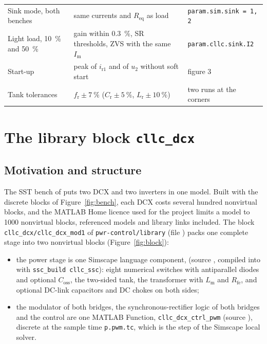 \documentclass[12pt,a4paper]{scrartcl}
\newcommand{\ped}[1]{_{\mathrm{#1}}}
\newcommand{\code}[1]{\texttt{#1}}
\begin{document}
\begin{onehalfspace}
\begin{table}[H]
\begin{tabularx}{0.97\textwidth}{@{} >{\raggedright\arraybackslash}p{} >{\raggedright\arraybackslash}p{} X @{}}
		Sink mode, both benches & same currents and $R\ped{eq}$ as load & \code{param.sim.sink = 1, 2} \\
		Light load, \SI{10}{\percent} and \SI{50}{\percent} & gain within \SI{0.3}{\percent}, SR thresholds, ZVS with the same $I\ped{m}$ & \code{param.cllc.sink.I2} \\
		Start-up & peak of $i\ped{r1}$ and of $u\ped{2}$ without soft start & figure 3 \\
		Tank tolerances & $f\ped{r} \pm \SI{7}{\percent}$ ($C\ped{r} \pm \SI{5}{\percent}$, $L\ped{r} \pm \SI{10}{\percent}$) & two runs at the corners \\
		\bottomrule
	\end{tabularx}
\end{table}

\section{The library block \code{cllc\_dcx}}
\label{sec:library}

\subsection{Motivation and structure}
\label{sec:lib_structure}

The SST bench of \cite{sst_doc} puts two DCX and two inverters in one model. Built with the discrete blocks of Figure~\ref{fig:bench}, each DCX costs several hundred nonvirtual blocks, and the MATLAB Home licence used for the project limits a model to 1000 nonvirtual blocks, referenced models and library links included. The block \code{cllc\_dcx/cllc\_dcx\_mod1} of \code{pwr-control/library} (file ) packs one complete stage into two nonvirtual blocks (Figure~\ref{fig:block}):

\begin{itemize}[nosep]
	\item the power stage is one Simscape language component,  (source , compiled into  with \code{ssc\_build cllc\_ssc}): eight numerical switches with antiparallel diodes and optional $C\ped{oss}$, the two-sided tank, the transformer with $L\ped{m}$ and $R\ped{fe}$, and optional DC-link capacitors and DC chokes on both sides;
	\item the modulator of both bridges, the synchronous-rectifier logic of both bridges and the control are one MATLAB Function, \code{cllc\_dcx\_ctrl\_pwm} (source ), discrete at the sample time \code{p.pwm.tc}, which is the step of the Simscape local solver.
\end{itemize}


\end{onehalfspace}
\end{document}
